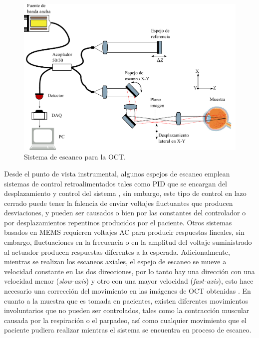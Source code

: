 \begin{figure}[th!]
	\centering
	\includegraphics[width=0.7\linewidth]{img/scaning_system_oc.pdf}
	\caption{Sistema de escaneo para la OCT.}
	\label{fig:scaningsystemoct}
\end{figure}


Desde el punto de vista instrumental, algunos espejos de escaneo emplean sistemas de control retroalimentados tales como PID que se encargan del desplazamiento y control del sistema \cite{xie2004}, sin embargo, este tipo de control en lazo cerrado puede tener la falencia de enviar voltajes fluctuantes  que producen desviaciones, y pueden ser causados o bien por las constantes del controlador o por desplazamientos repentinos producidos por el paciente. Otros sistemas basados en MEMS \cite{Strathman2014} requieren voltajes AC para producir respuestas lineales, sin embargo, fluctuaciones en la frecuencia o en la amplitud del voltaje suministrado al actuador producen respuestas diferentes a la esperada. Adicionalmente, mientras se realizan los escaneos axiales, el espejo de escaneo se mueve a velocidad constante en las dos direcciones, por lo tanto hay una dirección con una velocidad menor (\emph{slow-axis}) y otro con una mayor velocidad (\emph{fast-axis}), esto hace necesario una corrección del movimiento en las imágenes de OCT obtenidas \cite{Yun2004, Pierce2005, Drexler2015}. En cuanto a la muestra que es tomada en pacientes, existen diferentes movimientos involuntarios que no pueden ser controlados, tales como la contracción muscular causada por la respiración o el parpadeo, así como cualquier movimiento que el paciente pudiera realizar mientras el sistema se encuentra en proceso de escaneo.

